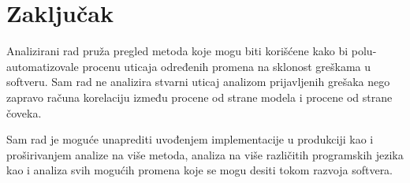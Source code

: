 \documentclass[twocolumns]{article}
\begin{document}
\section{Zaključak}
\label{sec:conclusion}

Analizirani rad pruža pregled metoda koje mogu biti korišćene kako bi polu-automatizovale procenu uticaja određenih promena na sklonost greškama u softveru. Sam rad ne analizira stvarni uticaj analizom prijavljenih grešaka nego zapravo računa korelaciju između procene od strane modela i procene od strane čoveka. 

Sam rad je moguće unaprediti uvođenjem implementacije u produkciji kao i proširivanjem analize na više metoda, analiza na više različitih programskih jezika kao i analiza svih mogućih promena koje se mogu desiti tokom razvoja softvera. 





\end{document}
